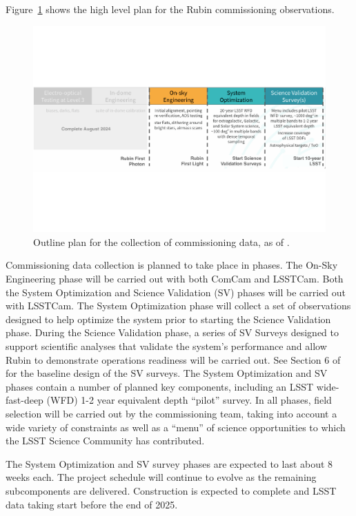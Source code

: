 Figure~\ref{fig:commissioning} shows the high level plan for the Rubin commissioning observations. 
\begin{figure}[htb]
\centering
\includegraphics[width=0.95\linewidth]{figures/commissioning-plan}
\caption{Outline plan for the collection of commissioning data, as of \currentdate.}
\label{fig:commissioning}
\end{figure}
Commissioning data collection is planned to take place in phases.
The On-Sky Engineering phase will be carried out with both ComCam and LSSTCam.
Both the System Optimization and Science Validation (SV) phases will be carried out with LSSTCam. 
The System Optimization phase will collect a set of observations designed to help optimize the system prior to starting the Science Validation phase.
During the Science Validation phase, a series of SV Surveys designed to support scientific analyses that validate the system's performance and allow Rubin to demonstrate operations readiness will be carried out. See Section 6 of  for the baseline design of the SV surveys.
The System Optimization and SV phases contain a number of planned key components, including an LSST wide-fast-deep (WFD) 1-2 year equivalent depth ``pilot'' survey.
In all phases, field selection will be carried out by the commissioning team, taking into account a wide variety of constraints as well as a ``menu'' of science opportunities to which the LSST Science Community has contributed.

The System Optimization and SV survey phases are expected to last about 8 weeks each.
The project schedule will continue to evolve as the remaining subcomponents are delivered. 
Construction is expected to complete and LSST data taking start before the end of 2025.

